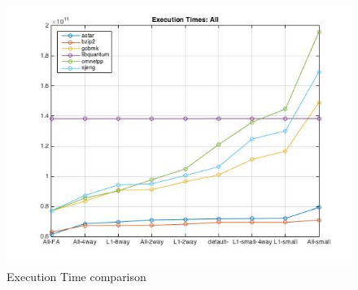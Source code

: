 \documentclass[11pt,titlepage]{article}
\begin{document}
     \begin{figure}[H]
      \centering
      \includegraphics[scale=0.65]{ExecutionTimes_All}
      \caption{Execution Time comparison}
      \label{fig:etalll}
    \end{figure}

    
    
\end{document}
